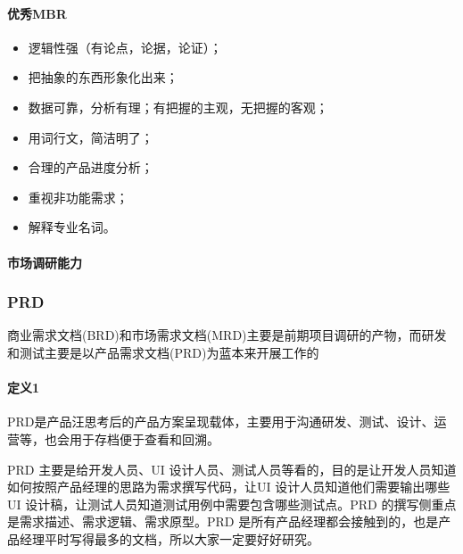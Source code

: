 \documentclass[letterpaper,11pt,english]{sphinxmanual}
\begin{document}
\paragraph{优秀MBR}
\label{\detokenize{chapter_skill/MRD:mbr}}\begin{itemize}
\item {} 
逻辑性强（有论点，论据，论证）；

\item {} 
把抽象的东西形象化出来；

\item {} 
数据可靠，分析有理；有把握的主观，无把握的客观；

\item {} 
用词行文，简洁明了；

\item {} 
合理的产品进度分析；

\item {} 
重视非功能需求；

\item {} 
解释专业名词。

\end{itemize}


\paragraph{市场调研能力}
\label{\detokenize{chapter_skill/MRD:id5}}

\subsubsection{PRD}
\label{\detokenize{chapter_skill/PRD:prd}}\label{\detokenize{chapter_skill/PRD::doc}}
商业需求文档(BRD)和市场需求文档(MRD)主要是前期项目调研的产物，而研发和测试主要是以产品需求文档(PRD)为蓝本来开展工作的


\paragraph{定义1\sphinxfootnotemark[179]}
\label{\detokenize{chapter_skill/PRD:id1}}%
\begin{footnotetext}[179]\sphinxAtStartFootnote
{}
%
\end{footnotetext}\ignorespaces 
PRD是产品汪思考后的产品方案呈现载体，主要用于沟通研发、测试、设计、运营等，也会用于存档便于查看和回溯。

PRD 主要是给开发人员、UI
设计人员、测试人员等看的，目的是让开发人员知道如何按照产品经理的思路为需求撰写代码，让UI
设计人员知道他们需要输出哪些UI
设计稿，让测试人员知道测试用例中需要包含哪些测试点。PRD
的撰写侧重点是需求描述、需求逻辑、需求原型。PRD
是所有产品经理都会接触到的，也是产品经理平时写得最多的文档，所以大家一定要好好研究。
\end{document}
